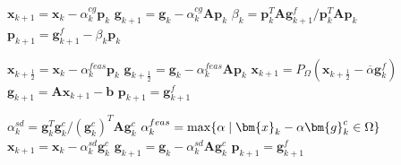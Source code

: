 \documentclass[11pt]{article}
\theoremstyle{plain}
\theoremstyle{definition}
\newcommand{\Vbeta}{\bm{g}^c}
\newcommand{\Vphi}{\bm{g}^f}
\newcommand{\md}{\;\ifnum\currentgrouptype=16 \middle\fi|\;}
\newcommand{\Vb}{\bm{b}}
\newcommand{\Vg}{\bm{g}}
\newcommand{\Vp}{\bm{p}}
\newcommand{\Vx}{\bm{x}}
\newcommand{\MA}{\bm{A}}
\begin{document}
\begin{algorithm}[htbp]
    \SetStartEndCondition{ }{}{}%
    \DontPrintSemicolon
    \AlgoDontDisplayBlockMarkers\SetAlgoNoEnd\SetAlgoNoLine%
    $\Vx_{k+1} = \Vx_{k} -\alpha^{cg}_k\Vp_k$\;
    $\Vg_{k+1} = \Vg_k - \alpha^{cg}_k \MA \Vp_k$\;
    $\beta_k = \Vp^T_k \MA \Vphi_{k+1} / \Vp^T_k \MA \Vp_k$\;
    $\Vp_{k+1} = \Vphi_{k+1} -\beta_k \Vp_k$\;
    \caption{CG step}
    \label{alg:mpgpCg}
\end{algorithm}

\begin{algorithm}[htbp]
    \SetStartEndCondition{ }{}{}%
    \DontPrintSemicolon
    \AlgoDontDisplayBlockMarkers\SetAlgoNoEnd\SetAlgoNoLine%
    $\Vx_{k+\frac{1}{2}} = \Vx_{k} - \alpha^{feas}_k \Vp_k$\;
    $\Vg_{k+\frac{1}{2}} = \Vg_k - \alpha^{feas}_k \MA \Vp_k$\;
    $\Vx_{k+1} = P_{\Omega} (\Vx_{k+\frac{1}{2}} -\overline{\alpha} \Vg_k^f)$\;
    $\Vg_{k+1} = \MA \Vx_{k+1} -\Vb$\;
    $\Vp_{k+1} = \Vphi_{k+1}$
    \caption{Expansion step}
    \label{alg:exp}
\end{algorithm}

\begin{algorithm}[htbp]
    \SetStartEndCondition{ }{}{}%
    \DontPrintSemicolon
    \AlgoDontDisplayBlockMarkers\SetAlgoNoEnd\SetAlgoNoLine%
    $\alpha^{sd}_k = \Vg^T_k \Vbeta_k / (\Vbeta_k)^T \MA \Vbeta_k$\;
    $\alpha^{feas}_k = \max\{\alpha\md \Vx_k - \alpha \Vbeta_k \in \Omega\}$\;
    $\Vx_{k+1} = \Vx_{k} -\alpha^{sd}_k\Vbeta_k$\;
    $\Vg_{k+1} = \Vg_{k} - \alpha^{sd}_k \MA \Vbeta_k$\;
    $\Vp_{k+1} = \Vphi_{k+1}$\;
    \caption{Proportioning step}
    \label{alg:prop}
\end{algorithm}
\end{document}
